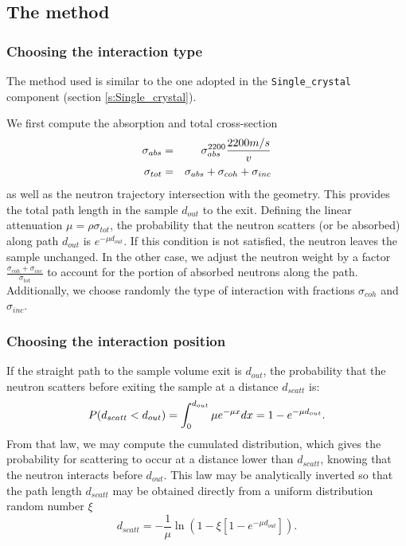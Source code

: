 \subsection{The method}

\subsubsection{Choosing the interaction type}

The method used is similar to the one adopted in the \verb+Single_crystal+ component (section \ref{s:Single_crystal}).

We first compute the absorption and total cross-section
\begin{eqnarray}
\sigma_{abs} &=& \sigma_{abs}^{{\rm 2200}}\frac{2200 m/s}{v} \\
\sigma_{tot} &=& \sigma_{abs} + \sigma_{coh} + \sigma_{inc}
\end{eqnarray}
as well as the neutron trajectory intersection with the geometry. This provides the total path length in the sample $d_{out}$ to the exit.
Defining the linear attenuation $\mu = \rho\sigma_{tot}$, the probability that the neutron scatters (or be absorbed) along path $d_{out}$ is $e^{-\mu d_{out}}$. If this condition is not satisfied, the neutron leaves the sample unchanged.
In the other case, we adjust the neutron weight by a factor $\frac{\sigma_{coh} + \sigma_{inc}}{\sigma_{tot}}$ to account for the portion of absorbed neutrons along the path.
Additionally, we choose randomly the type of interaction with fractions $\sigma_{coh}$ and $\sigma_{inc}$.

\subsubsection{Choosing the interaction position}

If the straight path to the sample volume exit is $d_{out}$, the probability that the neutron scatters before exiting the sample at a distance $d_{scatt}$ is:
\begin{equation}
P(d_{scatt} < d_{out}) = \int_0^{d_{out}} \mu e^{-\mu x}dx = 1 - e^{-\mu d_{out}}. \\
\end{equation}
From that law, we may compute the cumulated distribution, which gives the probability for scattering to occur at a distance lower than $d_{scatt}$, knowing that the neutron interacts before $d_{out}$. This law may be analytically inverted so that the path length $d_{scatt}$ may be obtained directly from a uniform distribution random number $\xi$
\begin{equation}
d_{scatt} = -\frac{1}{\mu} \ln(1 - \xi[1 -e^{-\mu d_{out}}]).
\end{equation}


